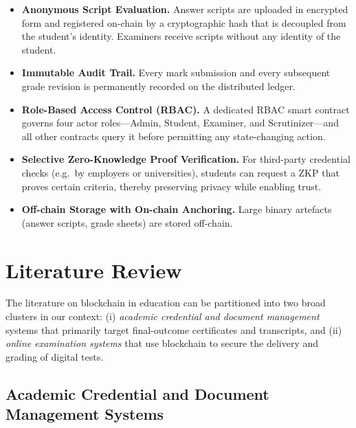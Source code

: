 \documentclass[conference]{IEEEtran}
\begin{document}
\begin{itemize}

    \item \textbf{Anonymous Script Evaluation.}  Answer scripts are uploaded
    in encrypted form and registered on-chain by a cryptographic hash that is
    decoupled from the student's identity.  Examiners receive scripts without
    any identity of the student.
 
    \item \textbf{Immutable Audit Trail.}  Every mark submission and every
    subsequent grade revision is permanently recorded on the distributed
    ledger.
 
    \item \textbf{Role-Based Access Control (RBAC).}  A dedicated RBAC smart
    contract governs four actor roles---Admin, Student, Examiner, and
    Scrutinizer---and all other contracts query it before permitting any
    state-changing action.
 
    \item \textbf{Selective Zero-Knowledge Proof Verification.}  For
    third-party credential checks (e.g.\ by employers or universities),
    students can request a ZKP that proves certain criteria, thereby preserving privacy while
    enabling trust.
 
    \item \textbf{Off-chain Storage with On-chain Anchoring.}  Large binary
    artefacts (answer scripts, grade sheets) are stored off-chain.
\end{itemize}
 

\section{Literature Review}
\label{sec:litrev}
 
The literature on blockchain in education can be partitioned into two broad
clusters in our context: (i) \emph{academic credential and document management} systems that
primarily target final-outcome certificates and transcripts, and (ii)
\emph{online examination systems} that use blockchain to secure the delivery
and grading of digital tests.  
 
\subsection{Academic Credential and Document Management Systems}
 
\end{document}

